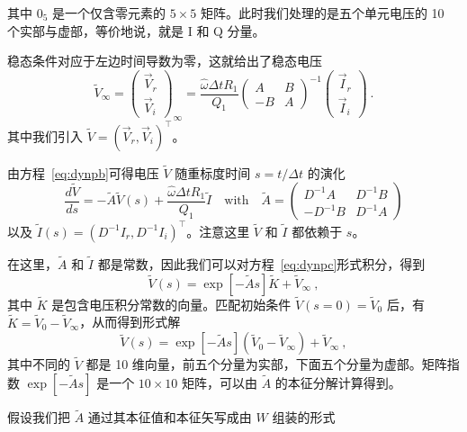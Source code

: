 \documentclass[12pt]{article}
\newcommand\ho{\hat\omega}
\newcommand\dt{\Delta t}
\begin{document}
其中 $0_5$ 是一个仅含零元素的 $5\times 5$ 矩阵。此时我们处理的是五个单元电压的 10 个实部与虚部，等价地说，就是 I 和 Q 分量。
\par
稳态条件对应于左边时间导数为零，这就给出了稳态电压
\begin{equation}
  \tilde V_{\infty} =
  \left(\begin{array}{c} \vec V_r \\ \vec V_i\end{array}\right)_{\infty}
  = \frac{\ho\dt R_1}{Q_1}
  \left(\begin{array}{rr} A & B \\ -B & A\end{array}\right)^{-1}
  \left(\begin{array}{c} \vec I_r \\ \vec I_i\end{array}\right)\ .
\end{equation}
其中我们引入 $\tilde V=(\vec V_r,\vec V_i)^{\top}$。
\par
由方程~\ref{eq:dynpb}可得电压 $\tilde V$ 随重标度时间 $s=t/\dt$ 的演化
\begin{equation}\label{eq:dynpc}
  \frac{d\tilde V}{ds} = -\tilde A \tilde V(s)+\frac{\ho\dt R_1}{Q_1}\tilde I
  \quad\mathrm{with}\quad
  \tilde A=\left(\begin{array}{rr} D^{-1}A & D^{-1}B \\ -D^{-1}B & D^{-1}A\end{array}\right)
\end{equation}
以及 $\tilde I(s)=(D^{-1}I_r, D^{-1}I_i)^{\top}$。注意这里 $\tilde V$ 和 $\tilde I$ 都依赖于 $s$。
\par
在这里，$\tilde A$ 和 $\tilde I$ 都是常数，因此我们可以对方程~\ref{eq:dynpc}形式积分，得到
\begin{equation}
  \tilde V(s)=\exp\left[-\tilde A s\right]\tilde K + \tilde V_{\infty}\ ,
\end{equation}
其中 $\tilde K$ 是包含电压积分常数的向量。匹配初始条件 $\tilde V(s=0)=\tilde V_0$ 后，有 $\tilde K=\tilde V_0-\tilde V_{\infty}$，从而得到形式解
\begin{equation}\label{eq:dynpd}
  \tilde V(s)=\exp\left[-\tilde A s\right]\left(\tilde V_0-\tilde V_{\infty}\right)
  + \tilde V_{\infty}\ ,
\end{equation}
其中不同的 $\tilde V$ 都是 10 维向量，前五个分量为实部，下面五个分量为虚部。矩阵指数 $\exp\left[-\tilde A s\right]$ 是一个 $10\times 10$ 矩阵，可以由 $\tilde A$ 的本征分解计算得到。
\par
假设我们把 $\tilde A$ 通过其本征值和本征矢写成由 $W$ 组装的形式
\end{document}
